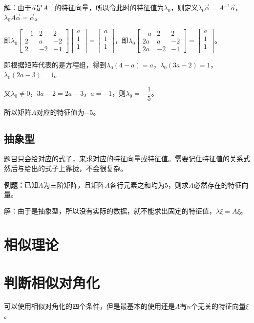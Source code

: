 \documentclass[UTF8, 12pt]{ctexart}
\begin{document}
解：由于$\overrightarrow{\alpha}$是$A^{-1}$的特征向量，所以令此时的特征值为$\lambda_0$，则定义$\lambda_0\overrightarrow{\alpha}=A^{-1}\overrightarrow{\alpha}$，$\lambda_0A\overrightarrow{\alpha}=\overrightarrow{\alpha}$。

即$\lambda_0\left[\begin{array}{ccc}
    -1 & 2 & 2 \\
    2 & a & -2 \\
    2 & -2 & -1
\end{array}\right]\left[\begin{array}{c}
    a \\
    1 \\
    1 \\
\end{array}\right]=\left[\begin{array}{c}
    a \\
    1 \\
    1 \\
\end{array}\right]$，即$\lambda_0\left[\begin{array}{ccc}
    -a & 2 & 2 \\
    2a & a & -2 \\
    2a & -2 & -1
\end{array}\right]=\left[\begin{array}{c}
    a \\
    1 \\
    1 \\
\end{array}\right]$。\medskip

即根据矩阵代表的是方程组，得到$\lambda_0(4-a)=a$，$\lambda_0(3a-2)=1$，$\lambda_0(2a-3)=1$。

又$\lambda_0\neq0$，$3a-2=2a-3$，$a=-1$，则$\lambda_0=-\dfrac{1}{5}$。

所以矩阵$A$对应的特征值为$-5$。

\subsection{抽象型}

题目只会给对应的式子，来求对应的特征向量或特征值。需要记住特征值的关系式然后与给出的式子上靠拢，不会很复杂。

\textbf{例题：}已知$A$为三阶矩阵，且矩阵$A$各行元素之和均为5，则求$A$必然存在的特征向量。

解：由于是抽象型，所以没有实际的数据，就不能求出固定的特征值，$\lambda\xi=A\xi$。

\section{相似理论}

\section{判断相似对角化}

可以使用相似对角化的四个条件，但是最基本的使用还是$A$有$n$个无关的特征向量$\xi$。
\end{document}
